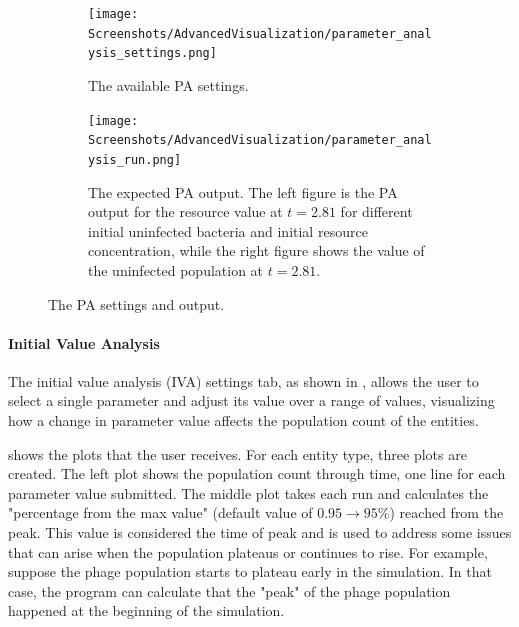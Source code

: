 \begin{figure}[h!]
    \centering
    \begin{subfigure}{0.49\linewidth}
        \centering
        \captionsetup{width=1\linewidth}
        \texttt{[image: Screenshots/AdvancedVisualization/parameter\_analysis\_settings.png]}
        \caption{
            The available PA settings. 
        }
        \label{fig:ss:av:parameter_analysis_settings}
    \end{subfigure}
    \hfill
    \begin{subfigure}{0.49\linewidth}
        \centering
        \captionsetup{width=1\linewidth}
        \texttt{[image: Screenshots/AdvancedVisualization/parameter\_analysis\_run.png]}
        \caption{
            The expected PA output. 
            The left figure is the PA output for the resource value at $t=2.81$ for different initial uninfected bacteria and initial resource concentration, while the right figure shows the value of the uninfected population at $t=2.81$. 
        }
        \label{fig:ss:av:parameter_analysis_run}
    \end{subfigure}
    \caption{The PA settings and output.}
\end{figure}

\paragraph{Initial Value Analysis}
\label{sec:initial_value_analysis}
The initial value analysis (IVA) settings tab, as shown in , allows the user to select a single parameter and adjust its value over a range of values, visualizing how a change in parameter value affects the population count of the entities.

 shows the plots that the user receives.
For each entity type, three plots are created.
The left plot shows the population count through time, one line for each parameter value submitted.
The middle plot takes each run and calculates the "percentage from the max value" (default value of $0.95 \rightarrow 95\%$) reached from the peak.
This value is considered the time of peak and is used to address some issues that can arise when the population plateaus or continues to rise.
For example, suppose the phage population starts to plateau early in the simulation. 
In that case, the program can calculate that the "peak" of the phage population happened at the beginning of the simulation. 

